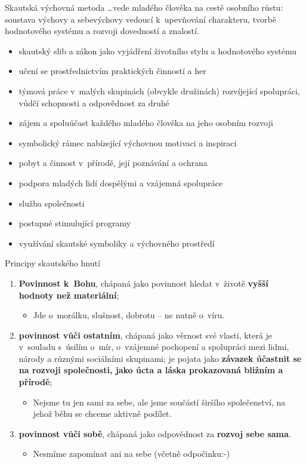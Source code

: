 \documentclass[compress,utf8,xcolor=dvipsnames]{beamer}
\begin{document}
\begin{frame}{Skautská výchovná metoda}
\ldots vede mladého člověka na cestě osobního růstu: soustava výchovy a sebevýchovy vedoucí k~upevňování charakteru, tvorbě hodnotového systému a rozvoji dovedností a znalostí.
\begin{itemize}
\item skautský slib a zákon jako vyjádření životního stylu a hodnotového systému
\item učení se prostřednictvím praktických činností a her
\item týmová práce v~malých skupinách (obvykle družinách) rozvíjející spolupráci, vůdčí schopnosti a odpovědnost za druhé
\item zájem a spoluúčast každého mladého člověka na jeho osobním rozvoji
\item symbolický rámec nabízející výchovnou motivaci a inspiraci
\item pobyt a činnost v~přírodě, její poznávání a ochrana
\item podpora mladých lidí dospělými a vzájemná spolupráce
\item služba společnosti
\item postupné stimulující programy
\item využívání skautské symboliky a výchovného prostředí
\end{itemize}
\end{frame}

\begin{frame}{Principy skautského hnutí}
\begin{enumerate}
\item \textbf{Povinnost k~Bohu}, chápaná jako povinnost hledat v~životě \textbf{vyšší hodnoty než materiální};
 \begin{itemize}
 \item Jde o~morálku, slušnost, dobrotu -- ne nutně o~víru.
 \end{itemize}
\item \textbf{povinnost vůči ostatním}, chápaná jako věrnost své vlasti, která je v~souladu s~úsilím o~mír, o~vzájemné pochopení a spolupráci mezi lidmi, národy a různými sociálními skupinami; je pojata jako 	\textbf{závazek účastnit se na rozvoji společnosti, jako úcta a láska prokazovaná bližním a přírodě};
 \begin{itemize}
 \item Nejsme tu jen sami za sebe, ale jsme součástí širšího společenství, na jehož běhu se chceme aktivně podílet.
 \end{itemize}
\item \textbf{povinnost vůči sobě}, chápaná jako odpovědnost za \textbf{rozvoj sebe sama}.
 \begin{itemize}
 \item Nesmíme zapomínat ani na sebe (včetně odpočinku:-)
 \end{itemize}
\end{enumerate}
\end{frame}
\end{document}
